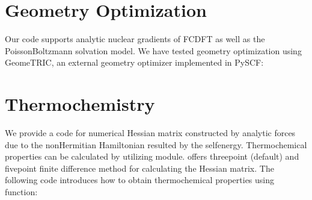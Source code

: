 \documentclass[letterpaper,10pt,english]{sphinxmanual}
\begin{document}
\begin{sphinxVerbatim}[commandchars=\\\{\}]
      
  
  
  
   
\end{sphinxVerbatim}


\section{Geometry Optimization}
\label{\detokenize{examples:geometry-optimization}}
\sphinxAtStartPar
Our code supports analytic nuclear gradients of FC\sphinxhyphen{}DFT as well as the Poisson\sphinxhyphen{}Boltzmann solvation model. We have tested geometry optimization using GeomeTRIC, an external geometry optimizer implemented in PySCF:

\begin{sphinxVerbatim}[commandchars=\\\{\}]
 
   
\end{sphinxVerbatim}


\section{Thermochemistry}
\label{\detokenize{examples:thermochemistry}}
\sphinxAtStartPar
We provide a code for numerical Hessian matrix constructed by analytic forces due to the non\sphinxhyphen{}Hermitian Hamiltonian resulted by the self\sphinxhyphen{}energy. Thermochemical properties can be calculated by utilizing  module.
 offers three\sphinxhyphen{}point (default) and five\sphinxhyphen{}point finite difference method for calculating the Hessian matrix. The following code introduces how to obtain thermochemical properties using  function:
\end{document}

